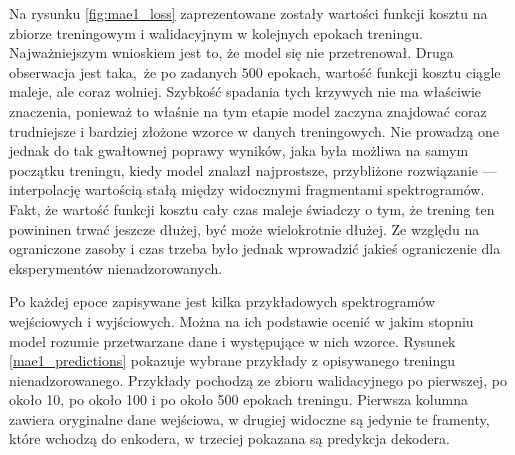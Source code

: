 Na rysunku \ref{fig:mae1_loss} zaprezentowane zostały wartości funkcji kosztu na zbiorze treningowym i walidacyjnym w kolejnych epokach treningu. Najważniejszym wnioskiem jest to, że model się nie przetrenował. Druga obserwacja jest taka, że po zadanych $500$ epokach, wartość funkcji kosztu ciągle maleje, ale coraz wolniej. Szybkość spadania tych krzywych nie ma właściwie znaczenia, ponieważ to właśnie na tym etapie model zaczyna znajdować coraz trudniejsze i bardziej złożone wzorce w danych treningowych. Nie prowadzą one jednak do tak gwałtownej poprawy wyników, jaka była możliwa na samym początku treningu, kiedy model znalazł najprostsze, przybliżone rozwiązanie --- interpolację wartością stałą między widocznymi fragmentami spektrogramów. Fakt, że wartość funkcji kosztu cały czas maleje świadczy o tym, że trening ten powininen trwać jeszcze dłużej, być może wielokrotnie dłużej. Ze względu na ograniczone zasoby i czas trzeba było jednak wprowadzić jakieś ograniczenie dla eksperymentów nienadzorowanych.

Po każdej epoce zapisywane jest kilka przykładowych spektrogramów wejściowych i wyjściowych. Można na ich podstawie ocenić w jakim stopniu model rozumie przetwarzane dane i występujące w nich wzorce. Rysunek \ref{mae1_predictions} pokazuje wybrane przykłady z opisywanego treningu nienadzorowanego. Przykłady pochodzą ze zbioru walidacyjnego po pierwszej, po około 10, po około 100 i po około 500 epokach treningu. Pierwsza kolumna zawiera oryginalne dane wejściowa, w drugiej widoczne są jedynie te framenty, które wchodzą do enkodera, w trzeciej pokazana są predykcja dekodera.

